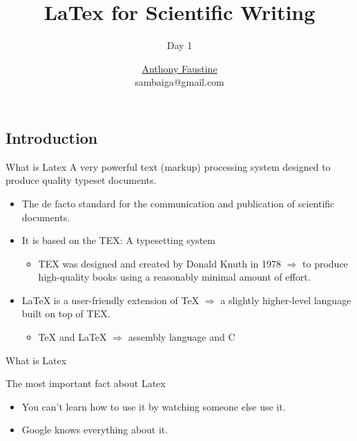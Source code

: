 \documentclass[handout]{beamer}
\title{ LaTex for Scientific Writing} %
\subtitle{Day 1} %
\author{\href{sambaiga.github.io}{Anthony Faustine} \\sambaiga@gmail.com}
\begin{document}
  \frame{\maketitle}


  \begin{darkframes}
    
\section{Introduction}
  \begin{frame}[<+->]{What is Latex}
  	A very powerful text (markup) processing system designed to produce quality typeset
  	documents.
  	\begin{itemize}
  		\item The de facto standard for the communication and publication of scientific documents.
  		\item It is based on the TEX: A typesetting system
  		\begin{itemize}
  			\item TEX was designed and created by Donald Knuth in 1978 $\Rightarrow$ to produce high-quality books using a
  			reasonably minimal amount of effort.
  		\end{itemize}
  		\item LaTeX is a user-friendly extension of TeX $\Rightarrow$  a slightly higher-level language built on top of TEX.
  		\begin{itemize}
  			\item TeX and LaTeX $\Rightarrow$ assembly language and C
  		\end{itemize}
  		
  	\end{itemize}
  \end{frame} 

 
   
   \begin{frame}[<+->]{What is Latex}
   	
   	\begin{block}{The most important fact about Latex}
   		\begin{itemize}
   			\item You can’t learn how to use it by watching someone else use it.
   			\item Google knows everything about it.


\end{itemize}
\end{block}
\end{frame}
\end{darkframes}
\end{document}
